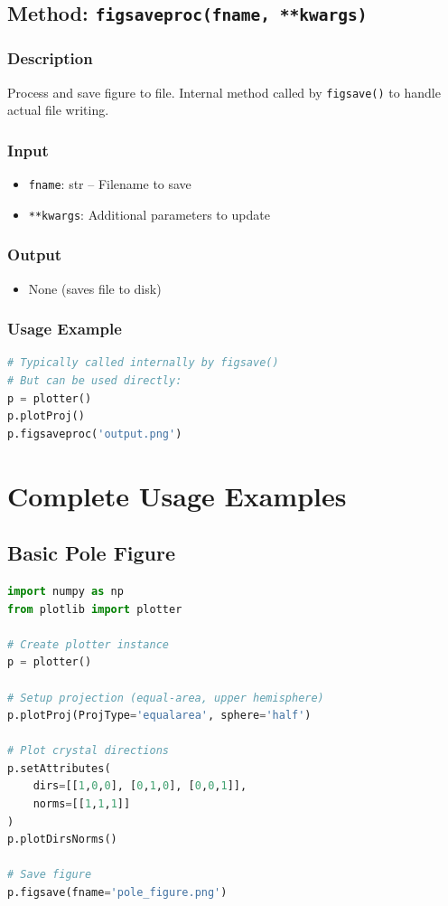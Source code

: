 \documentclass[11pt,a4paper]{article}
\begin{document}
\subsection{Method: \texttt{figsaveproc(fname, **kwargs)}}

\subsubsection{Description}
Process and save figure to file. Internal method called by \texttt{figsave()} to handle actual file writing.

\subsubsection{Input}
\begin{itemize}[leftmargin=*]
    \item \texttt{fname}: str -- Filename to save
    \item \texttt{**kwargs}: Additional parameters to update
\end{itemize}

\subsubsection{Output}
\begin{itemize}[leftmargin=*]
    \item None (saves file to disk)
\end{itemize}

\subsubsection{Usage Example}
\begin{lstlisting}[language=Python, caption=Direct file saving (typically called internally)]
# Typically called internally by figsave()
# But can be used directly:
p = plotter()
p.plotProj()
p.figsaveproc('output.png')
\end{lstlisting}

\section{Complete Usage Examples}

\subsection{Basic Pole Figure}

\begin{lstlisting}[language=Python, caption=Creating a basic pole figure]
import numpy as np
from plotlib import plotter

# Create plotter instance
p = plotter()

# Setup projection (equal-area, upper hemisphere)
p.plotProj(ProjType='equalarea', sphere='half')

# Plot crystal directions
p.setAttributes(
    dirs=[[1,0,0], [0,1,0], [0,0,1]],
    norms=[[1,1,1]]
)
p.plotDirsNorms()

# Save figure
p.figsave(fname='pole_figure.png')
\end{lstlisting}
\end{document}
